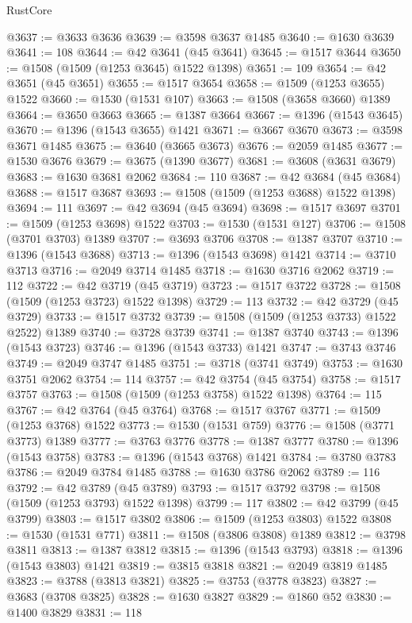 \begin{lexlean}{RustCore}
\begin{coremodule}
@3637 := @3633 @3636
@3639 := @3598 @3637 @1485
@3640 := @1630 @3639
@3641 := 108
@3644 := @42 @3641 (@45 @3641)
@3645 := @1517 @3644
@3650 := @1508 (@1509 (@1253 @3645) @1522 @1398)
@3651 := 109
@3654 := @42 @3651 (@45 @3651)
@3655 := @1517 @3654
@3658 := @1509 (@1253 @3655) @1522
@3660 := @1530 (@1531 @107)
@3663 := @1508 (@3658 @3660) @1389
@3664 := @3650 @3663
@3665 := @1387 @3664
@3667 := @1396 (@1543 @3645)
@3670 := @1396 (@1543 @3655) @1421
@3671 := @3667 @3670
@3673 := @3598 @3671 @1485
@3675 := @3640 (@3665 @3673)
@3676 := @2059 @1485
@3677 := @1530 @3676
@3679 := @3675 (@1390 @3677)
@3681 := @3608 (@3631 @3679)
@3683 := @1630 @3681 @2062
@3684 := 110
@3687 := @42 @3684 (@45 @3684)
@3688 := @1517 @3687
@3693 := @1508 (@1509 (@1253 @3688) @1522 @1398)
@3694 := 111
@3697 := @42 @3694 (@45 @3694)
@3698 := @1517 @3697
@3701 := @1509 (@1253 @3698) @1522
@3703 := @1530 (@1531 @127)
@3706 := @1508 (@3701 @3703) @1389
@3707 := @3693 @3706
@3708 := @1387 @3707
@3710 := @1396 (@1543 @3688)
@3713 := @1396 (@1543 @3698) @1421
@3714 := @3710 @3713
@3716 := @2049 @3714 @1485
@3718 := @1630 @3716 @2062
@3719 := 112
@3722 := @42 @3719 (@45 @3719)
@3723 := @1517 @3722
@3728 := @1508 (@1509 (@1253 @3723) @1522 @1398)
@3729 := 113
@3732 := @42 @3729 (@45 @3729)
@3733 := @1517 @3732
@3739 := @1508 (@1509 (@1253 @3733) @1522 @2522) @1389
@3740 := @3728 @3739
@3741 := @1387 @3740
@3743 := @1396 (@1543 @3723)
@3746 := @1396 (@1543 @3733) @1421
@3747 := @3743 @3746
@3749 := @2049 @3747 @1485
@3751 := @3718 (@3741 @3749)
@3753 := @1630 @3751 @2062
@3754 := 114
@3757 := @42 @3754 (@45 @3754)
@3758 := @1517 @3757
@3763 := @1508 (@1509 (@1253 @3758) @1522 @1398)
@3764 := 115
@3767 := @42 @3764 (@45 @3764)
@3768 := @1517 @3767
@3771 := @1509 (@1253 @3768) @1522
@3773 := @1530 (@1531 @759)
@3776 := @1508 (@3771 @3773) @1389
@3777 := @3763 @3776
@3778 := @1387 @3777
@3780 := @1396 (@1543 @3758)
@3783 := @1396 (@1543 @3768) @1421
@3784 := @3780 @3783
@3786 := @2049 @3784 @1485
@3788 := @1630 @3786 @2062
@3789 := 116
@3792 := @42 @3789 (@45 @3789)
@3793 := @1517 @3792
@3798 := @1508 (@1509 (@1253 @3793) @1522 @1398)
@3799 := 117
@3802 := @42 @3799 (@45 @3799)
@3803 := @1517 @3802
@3806 := @1509 (@1253 @3803) @1522
@3808 := @1530 (@1531 @771)
@3811 := @1508 (@3806 @3808) @1389
@3812 := @3798 @3811
@3813 := @1387 @3812
@3815 := @1396 (@1543 @3793)
@3818 := @1396 (@1543 @3803) @1421
@3819 := @3815 @3818
@3821 := @2049 @3819 @1485
@3823 := @3788 (@3813 @3821)
@3825 := @3753 (@3778 @3823)
@3827 := @3683 (@3708 @3825)
@3828 := @1630 @3827
@3829 := @1860 @52
@3830 := @1400 @3829
@3831 := 118

\end{coremodule}
\end{lexlean}
